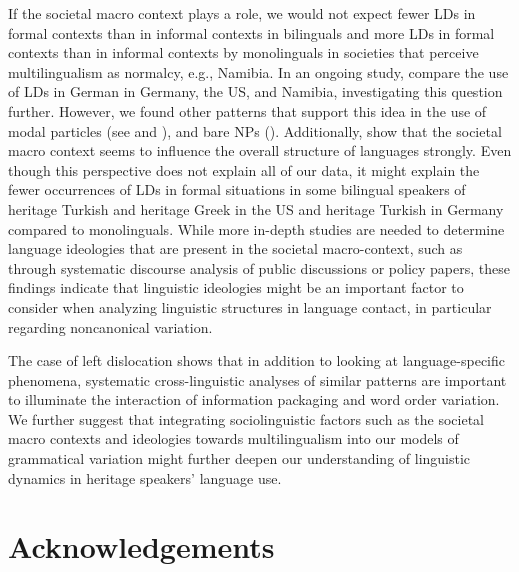 \documentclass[output=paper,colorlinks,citecolor=brown]{langscibook}
\begin{document}
If the societal macro context plays a role, we would not expect fewer LDs in formal contexts than in informal contexts in bilinguals and more LDs in formal contexts than in informal contexts by monolinguals in societies that perceive multilingualism as normalcy, e.g., Namibia. In an ongoing study, \citet{conti_left_nodate} compare the use of LDs in German in Germany, the US, and Namibia, investigating this question further. However, we found other patterns that support this idea in the use of modal particles (see \citeauthor{bunk_sociolinguistic_nodate} \citeyear{bunk_sociolinguistic_nodate} and ), and bare NPs (\cite{bunk_bare_nodate}). Additionally, \citet{wiese_heritage_2022} show that the societal macro context seems to influence the overall structure of languages strongly. Even though this perspective does not explain all of our data, it might explain the fewer occurrences of LDs in formal situations in some bilingual speakers of heritage Turkish and heritage Greek in the US and heritage Turkish in Germany compared to monolinguals. While more in-depth studies are needed to determine language ideologies that are present in the societal macro-context, such as through systematic discourse analysis of public discussions or policy papers, these findings indicate that linguistic ideologies might be an important factor to consider when analyzing linguistic structures in language contact, in particular regarding noncanonical variation.

The case of left dislocation shows that in addition to looking at language-specific phenomena, systematic cross-linguistic analyses of similar patterns are important to illuminate the interaction of information packaging and word order variation. We further suggest that integrating sociolinguistic factors such as the societal macro contexts and ideologies towards multilingualism into our models of grammatical variation might further deepen our understanding of linguistic dynamics in heritage speakers’ language use.


\section*{Acknowledgements}
\end{document}
